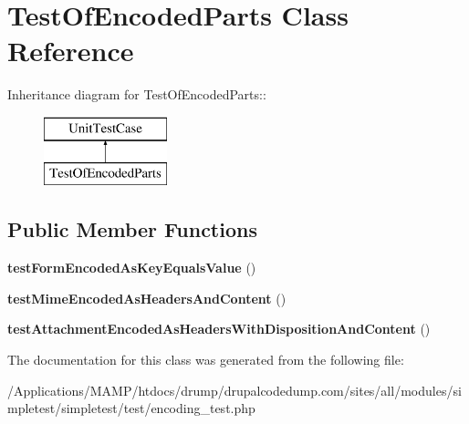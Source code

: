 \hypertarget{class_test_of_encoded_parts}{
\section{TestOfEncodedParts Class Reference}
\label{class_test_of_encoded_parts}
}
Inheritance diagram for TestOfEncodedParts::\begin{figure}[H]
\begin{center}
\leavevmode
\includegraphics[height=2cm]{class_test_of_encoded_parts}
\end{center}
\end{figure}
\subsection*{Public Member Functions}
\begin{DoxyCompactItemize}
\item 
\hypertarget{class_test_of_encoded_parts_ad3c2515f21e71cd8a154310c016e2423}{
{\bfseries testFormEncodedAsKeyEqualsValue} ()}
\label{class_test_of_encoded_parts_ad3c2515f21e71cd8a154310c016e2423}

\item 
\hypertarget{class_test_of_encoded_parts_a97d7ecdd67db59e42bd610f5d56829d7}{
{\bfseries testMimeEncodedAsHeadersAndContent} ()}
\label{class_test_of_encoded_parts_a97d7ecdd67db59e42bd610f5d56829d7}

\item 
\hypertarget{class_test_of_encoded_parts_a2813af03e37fade09ef20c1f3df33e7b}{
{\bfseries testAttachmentEncodedAsHeadersWithDispositionAndContent} ()}
\label{class_test_of_encoded_parts_a2813af03e37fade09ef20c1f3df33e7b}

\end{DoxyCompactItemize}


The documentation for this class was generated from the following file:\begin{DoxyCompactItemize}
\item 
/Applications/MAMP/htdocs/drump/drupalcodedump.com/sites/all/modules/simpletest/simpletest/test/encoding\_\-test.php\end{DoxyCompactItemize}
